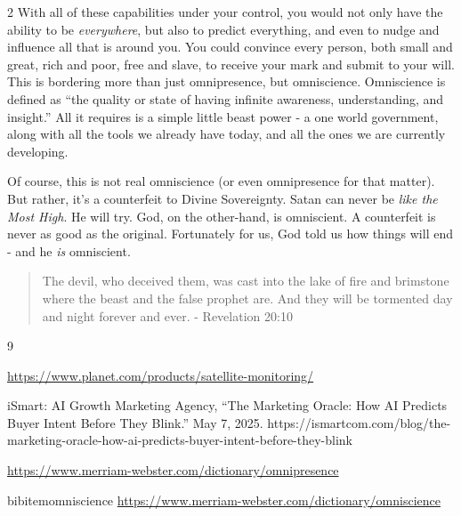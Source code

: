 \documentclass[10pt]{article}
\begin{document}
\begin{multicols}{2}
With all of these capabilities under your control, you would not only have the ability to be \textit{everywhere}, but also to predict everything, and even to nudge and influence all that is around you. You could convince every person, both small and great, rich and poor, free and slave, to receive your mark and submit to your will. This is bordering more than just omnipresence, but omniscience. Omniscience is defined as ``the quality or state of having infinite awareness, understanding, and insight.'' All it requires is a simple little beast power - a one world government, along with all the tools we already have today, and all the ones we are currently developing.

Of course, this is not real omniscience (or even omnipresence for that matter). But rather, it's a counterfeit to Divine Sovereignty. Satan can never be \textit{like the Most High}. He will try. God, on the other-hand, is omniscient. A counterfeit is never as good as the original. Fortunately for us, God told us how things will end - and he \textit{is} omniscient.

\begin{quotation}
The devil, who deceived them, was cast into the lake of fire and brimstone where the beast and the false prophet are. And they will be tormented day and night forever and ever. - Revelation 20:10
\end{quotation}



\begin{thebibliography}{9}
	{\footnotesize
		
	 \url{https://www.planet.com/products/satellite-monitoring/}
	
	 iSmart: AI Growth Marketing Agency, ``The Marketing Oracle: How AI Predicts Buyer Intent Before They Blink.'' May 7, 2025. https://ismartcom.com/blog/the-marketing-oracle-how-ai-predicts-buyer-intent-before-they-blink
	
	 \url{https://www.merriam-webster.com/dictionary/omnipresence}
	
	bibitem{omniscience} \url{https://www.merriam-webster.com/dictionary/omniscience}
	}
\end{thebibliography}

\end{multicols}


\end{document}
